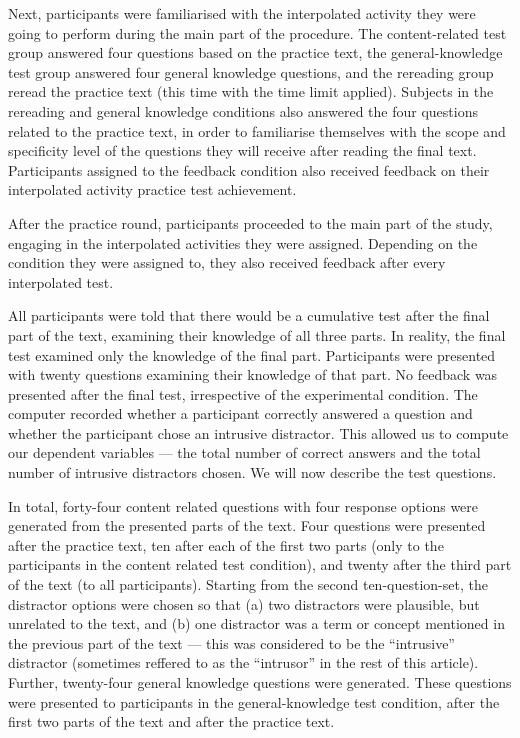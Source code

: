 \documentclass[11pt,]{article}
\begin{document}
Next, participants were familiarised with the interpolated activity they
were going to perform during the main part of the procedure. The
content-related test group answered four questions based on the practice
text, the general-knowledge test group answered four general knowledge
questions, and the rereading group reread the practice text (this time
with the time limit applied). Subjects in the rereading and general
knowledge conditions also answered the four questions related to the
practice text, in order to familiarise themselves with the scope and
specificity level of the questions they will receive after reading the
final text. Participants assigned to the feedback condition also
received feedback on their interpolated activity practice test
achievement.

After the practice round, participants proceeded to the main part of the
study, engaging in the interpolated activities they were assigned.
Depending on the condition they were assigned to, they also received
feedback after every interpolated test.

All participants were told that there would be a cumulative test after
the final part of the text, examining their knowledge of all three
parts. In reality, the final test examined only the knowledge of the
final part. Participants were presented with twenty questions examining
their knowledge of that part. No feedback was presented after the final
test, irrespective of the experimental condition. The computer recorded
whether a participant correctly answered a question and whether the
participant chose an intrusive distractor. This allowed us to compute
our dependent variables --- the total number of correct answers and the
total number of intrusive distractors chosen. We will now describe the
test questions.

In total, forty-four content related questions with four response
options were generated from the presented parts of the text. Four
questions were presented after the practice text, ten after each of the
first two parts (only to the participants in the content related test
condition), and twenty after the third part of the text (to all
participants). Starting from the second ten-question-set, the distractor
options were chosen so that (a) two distractors were plausible, but
unrelated to the text, and (b) one distractor was a term or concept
mentioned in the previous part of the text --- this was considered to be
the ``intrusive'' distractor (sometimes reffered to as the ``intrusor''
in the rest of this article). Further, twenty-four general knowledge
questions were generated. These questions were presented to participants
in the general-knowledge test condition, after the first two parts of
the text and after the practice text.
\end{document}
